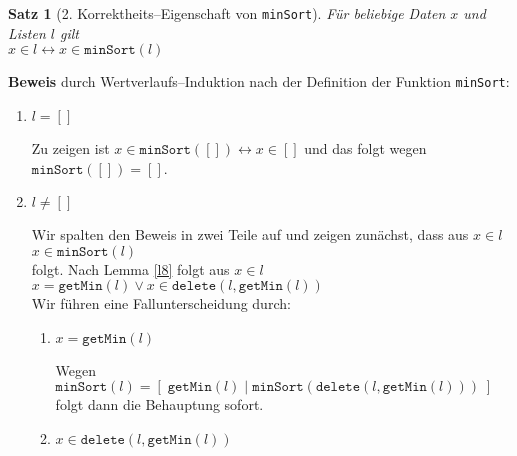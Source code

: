 \documentclass{article}
\newtheorem{Satz}[Definition]{Satz}
\begin{document}
\begin{Satz}[2. Korrektheits--Eigenschaft von \texttt{minSort}] 
F\"ur beliebige Daten $x$ und Listen $l$ gilt \\[0.1cm]
\hspace*{1.3cm} $x \in l \leftrightarrow x \in \mathtt{minSort}(l)$
\end{Satz}
\textbf{Beweis} durch Wertverlaufs--Induktion nach der Definition der Funktion \texttt{minSort}:
\begin{enumerate}
\item $l = []$

      Zu zeigen ist $x \in \mathtt{minSort}([]) \leftrightarrow x \in []$ und das folgt wegen $\mathtt{minSort}([]) = []$.
\item  $l \not= []$

       Wir spalten den Beweis in zwei Teile auf und zeigen zun\"achst, dass aus  $x \in l$ \\[0.1cm]
       \hspace*{1.3cm} $x \in \mathtt{minSort}(l)$ \\[0.1cm]
       folgt.  Nach Lemma \ref{l8} folgt aus $x \in l$ \\[0.1cm]
       \hspace*{1.3cm} $x = \mathtt{getMin}(l) \vee x \in \mathtt{delete}(l,\mathtt{getMin}(l))$ \\[0.1cm]
       Wir f\"uhren eine Fallunterscheidung durch:
       \begin{enumerate}
       \item $x = \mathtt{getMin}(l)$

             Wegen $\mathtt{minSort}(l) = [\;\mathtt{getMin}(l)\;|\;\mathtt{minSort}(\mathtt{delete}(l,\mathtt{getMin}(l)))\;]$ 
             folgt dann die Behauptung sofort.
       \item $x \in \mathtt{delete}(l,\mathtt{getMin}(l))$


\end{enumerate}
\end{enumerate}
\end{document}
